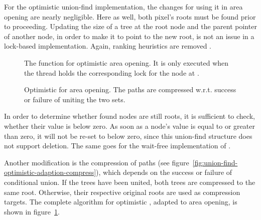 For the optimistic union-find implementation, the changes for using it in area
opening are nearly negligible. Here as well, both pixel's roots must be found
prior to proceeding. Updating the size of a tree at the root node and the parent
pointer of another node, in order to make it to point to the new root, is not an
issue in a lock-based implementation. Again, ranking heuristics are removed
\cite{Meijster2002Comparison}.

\begin{figure}
  \centering
  
  \caption[The  function for optimistic area opening.]{The
     function for optimistic area opening. It is only
    executed when the thread holds the corresponding lock for the node at
    .}
  \label{fig:union-find-optimistic-adaption-compress}

  
  \caption[Optimistic  for area opening.]{Optimistic
     for area opening. The paths are compressed w.r.t. success
    or failure of uniting the two sets.}
  \label{fig:union-find-optimistic-adaption-union}
\end{figure}

In order to determine whether found nodes are still roots, it is sufficient to
check, whether their  value is below zero. As soon as a
node's  value is equal to or greater than zero, it will not
be re-set to below zero, since this union-find structure does not support
deletion. The same goes for the wait-free implementation of .

Another modification is the compression of paths (see
figure~\ref{fig:union-find-optimistic-adaption-compress}), which depends on the
success or failure of conditional union. If the trees have been united, both
trees are compressed to the same root. Otherwise, their respective original
roots are used as compression targets. The complete algorithm for optimistic
, adapted to area opening, is shown in
figure~\ref{fig:union-find-optimistic-adaption-union}.

